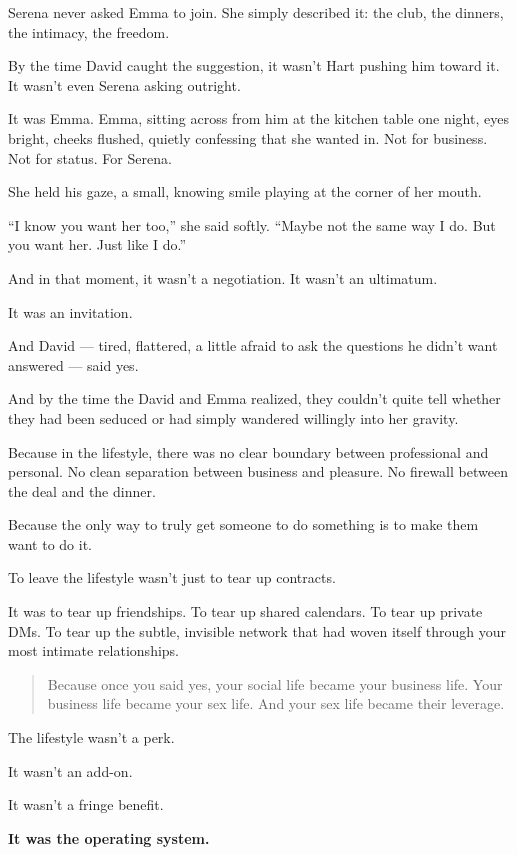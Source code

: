 Serena never asked Emma to join.  
She simply described it: the club, the dinners, the intimacy, the freedom.  

By the time David caught the suggestion, it wasn’t Hart pushing him toward it.  
It wasn’t even Serena asking outright.  

It was Emma.  
Emma, sitting across from him at the kitchen table one night, eyes bright, cheeks flushed, quietly confessing that she wanted in.  
Not for business.  
Not for status.  
For Serena.

She held his gaze, a small, knowing smile playing at the corner of her mouth.

“I know you want her too,” she said softly.  
“Maybe not the same way I do. But you want her. Just like I do.”

And in that moment, it wasn’t a negotiation.  
It wasn’t an ultimatum.  

It was an invitation.

And David --- tired, flattered, a little afraid to ask the questions he didn’t want answered ---  
said yes.


And by the time the David and Emma realized,  
they couldn’t quite tell whether they had been seduced  
or had simply wandered willingly into her gravity.

Because in the lifestyle, there was no clear boundary between professional and personal.  
No clean separation between business and pleasure.  
No firewall between the deal and the dinner.

Because the only way to truly get someone to do something  
is to make them want to do it.

To leave the lifestyle wasn’t just to tear up contracts.

It was to tear up friendships.  
To tear up shared calendars.  
To tear up private DMs.  
To tear up the subtle, invisible network that had woven itself through your most intimate relationships.

\begin{quote}
Because once you said yes,  
your social life became your business life.  
Your business life became your sex life.  
And your sex life became their leverage.
\end{quote}

The lifestyle wasn’t a perk.

It wasn’t an add-on.

It wasn’t a fringe benefit.

\textbf{It was the operating system.}

